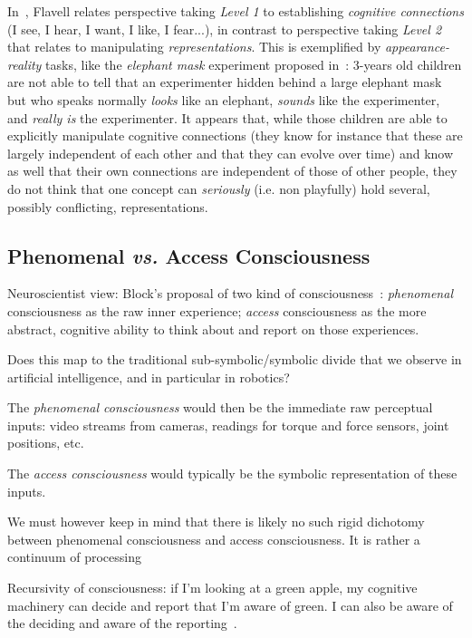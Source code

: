 \documentclass[a4paper]{article}
\newcommand{\ie}{i.e.\xspace}
\newcommand{\vs}{\textit{vs.}\xspace}
\begin{document}
In~\cite{flavell1990developmental}, Flavell relates perspective taking
\emph{Level 1} to establishing \emph{cognitive connections} (I see, I hear, I
want, I like, I fear...), in contrast to perspective taking \emph{Level 2} that
relates to manipulating \emph{representations}.  This is exemplified by
\emph{appearance-reality} tasks, like the \emph{elephant mask} experiment
proposed in~\cite{flavell1990developmental}: 3-years old children are not able
to tell that an experimenter hidden behind a large elephant mask but who speaks
normally \emph{looks} like an elephant, \emph{sounds} like the experimenter, and
\emph{really is} the experimenter.  It appears that, while those children are
able to explicitly manipulate cognitive connections (they know for instance that
these are largely independent of each other and that they can evolve over time)
and know as well that their own connections are independent of those of other
people, they do not think that one concept can \emph{seriously} (\ie non
playfully) hold several, possibly conflicting, representations.


\subsection{Phenomenal \vs Access Consciousness}

Neuroscientist view: Block's proposal of two kind of consciousness~\cite{block1996can}:
\emph{phenomenal} consciousness as the raw inner experience; \emph{access}
consciousness as the more abstract, cognitive ability to think about and report
on those experiences.

Does this map to the traditional sub-symbolic/symbolic divide that we observe in
artificial intelligence, and in particular in robotics?

The \emph{phenomenal consciousness} would then be the immediate raw perceptual
inputs: video streams from cameras, readings for torque and force sensors, joint
positions, etc.

The \emph{access consciousness} would typically be the symbolic representation
of these inputs.


We must however keep in mind that there is likely no such rigid dichotomy
between phenomenal consciousness and access consciousness. It is rather a
continuum of processing~\citep[p.55]{graziano2013consciousness}

Recursivity of consciousness: if I'm looking at a green apple, my cognitive
machinery can decide and report that I'm aware of green. I can also be aware of
the deciding and aware of the reporting~\citep[p.55]{graziano2013consciousness}.
\end{document}
